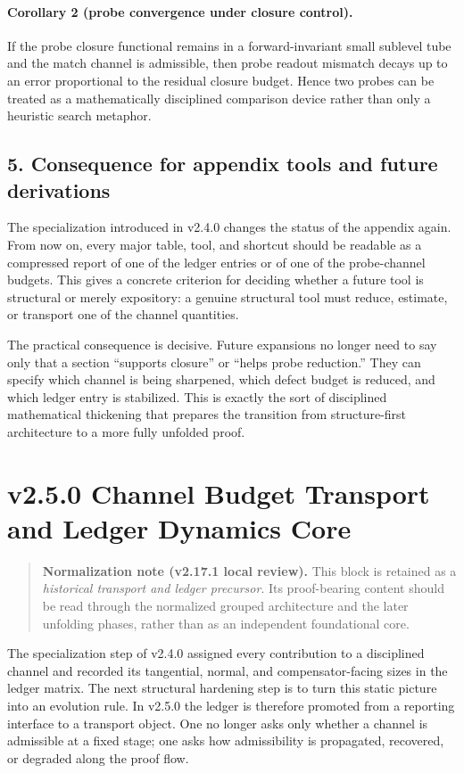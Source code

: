 \paragraph{Corollary 2 (probe convergence under closure control).}
If the probe closure functional remains in a forward-invariant small sublevel tube
and the match channel is admissible, then probe readout mismatch decays up to an
error proportional to the residual closure budget. Hence two probes can be treated
as a mathematically disciplined comparison device rather than only a heuristic
search metaphor.

\subsection*{5. Consequence for appendix tools and future derivations}
The specialization introduced in v2.4.0 changes the status of the appendix
again. From now on, every major table, tool, and shortcut should be readable as a
compressed report of one of the ledger entries or of one of the probe-channel
budgets. This gives a concrete criterion for deciding whether a future tool is
structural or merely expository: a genuine structural tool must reduce, estimate,
or transport one of the channel quantities.

The practical consequence is decisive. Future expansions no longer need to say only
that a section ``supports closure'' or ``helps probe reduction.'' They can specify
which channel is being sharpened, which defect budget is reduced, and which ledger
entry is stabilized. This is exactly the sort of disciplined mathematical
thickening that prepares the transition from structure-first architecture to a more
fully unfolded proof.


\section*{v2.5.0 Channel Budget Transport and Ledger Dynamics Core}

\begin{quote}
\textbf{Normalization note (v2.17.1 local review).}
This block is retained as a \emph{historical transport and ledger precursor}. Its proof-bearing content should be read through the normalized grouped architecture and the later unfolding phases, rather than as an independent foundational core.
\end{quote}

The specialization step of v2.4.0 assigned every contribution to a disciplined
channel and recorded its tangential, normal, and compensator-facing sizes in the
ledger matrix. The next structural hardening step is to turn this static picture
into an evolution rule. In v2.5.0 the ledger is therefore promoted from a
reporting interface to a transport object. One no longer asks only whether a
channel is admissible at a fixed stage; one asks how admissibility is propagated,
recovered, or degraded along the proof flow.

